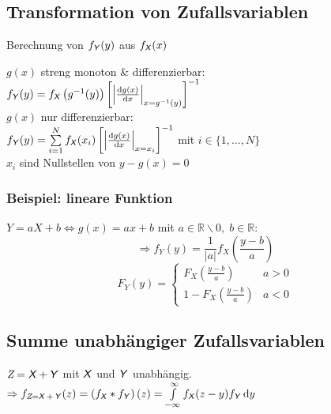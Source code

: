 \documentclass[german,color,6pt]{latex4ei/latex4ei_sheet}
\begin{document}
\begin{sectionbox}
	\subsection{Transformation von Zufallsvariablen}
	Berechnung von $f_{\operatorname{\textsf{\textit{Y}}}}(y)$ aus $f_{\operatorname{\textsf{\textit{X}}}}(x)$
	
	$g(x)$ streng monoton \& differenzierbar:\\
	$f_{\Y}(y) = f_{\X}\left(g^{-1}(y)\right)\left[\abs{\frac{\diff g(x)}{\diff x}}_{x = g^{-1}(y)}\right]^{-1}$\\
	$g(x)$ nur differenzierbar:\\
	$f_{\Y}(y) = \sum\limits_{i = 1}^{N}{f_{\X}(x_i)\left[\abs{\frac{\diff g(x)}{\diff x}}_{x = x_i}\right]^{-1}}$ mit $i \in \{1,\dots,N\}$ \\
	$x_i$ sind Nullstellen von $y - g(x) = 0$
	\subsubsection{Beispiel: lineare Funktion}
	$Y=aX+b \Leftrightarrow g(x)=ax+b$ mit $a\in\mathbb{R}\backslash 0,\;b\in\mathbb{R}$:
	\[\Rightarrow f_Y(y)=\frac{1}{|a|}f_X\left(\frac{y-b}{a}\right)\]
	\[F_Y(y)=\begin{cases}F_X\left(\frac{y-b}{a}\right) & a>0 \\ 1-F_X\left(\frac{y-b}{a}\right) & a<0\end{cases}\]
	
\end{sectionbox}

\begin{sectionbox}
	\subsection{Summe unabhängiger Zufallsvariablen}
	$\textit{Z} = \operatorname{\textsf{\textit{X}}} + \operatorname{\textsf{\textit{Y}}}$ mit $\operatorname{\textsf{\textit{X}}}$ und $\operatorname{\textsf{\textit{Y}}}$ unabhängig.\\
	$\Ra f_{\textit{Z} = \X + \Y}(z) = \left(f_{\X} \ast f_{\Y}\right)(z) = \int\limits_{-\infty}^{\infty}{f_{\X}(z-y)f_{\Y}\diff y}$
\end{sectionbox}



\end{document}
